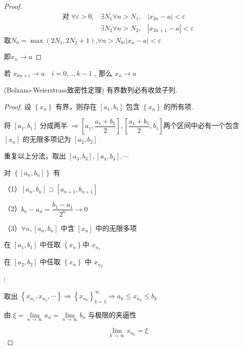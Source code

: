 \begin{proof}
	\begin{align*}
		\textbf{对 }\forall \varepsilon>0,&\exists N_1 \forall n>N_1, &\left|x_{2n}-a\right|<\varepsilon \\
		&\exists N_2 \forall n>N_2 ,&\left|x_{2 n+1}-a\right|<\varepsilon
	\end{align*}
	取$ N_0=\max(2 N_1,2 N_2+1)$,$\forall n>N_0$,$\left|x_n-a\right|<\varepsilon$
	
	即$  x_n \rightarrow a$
\end{proof}
\begin{corollary}
	若 $ x_{k n+i} \rightarrow a \quad i=0, . ., k-1$ , 那么  $ x_n \rightarrow a$
\end{corollary}
\begin{theorem}(Bolzano-Weierstrass致密性定理)
	有界数列必有收敛子列.
\end{theorem}
\begin{proof}
	设 $\left\{x_n\right\}$ 有界，则存在 $\left[a_1, b_1\right]$ 包含 $\left\{x_n\right\}$ 的所有项.
	
	将 $\left[a_1, b_1\right]$ 分成两半 $\Rightarrow\left[a_1, \dfrac{a_1+b_1}{2}\right],\left[\dfrac{a_1+b_1}{2}, b_1\right]$两个区间中必有一个包含 $\left[x_n\right]$ 的无限多项记为 $\left[a_2, b_2\right]$
	
	重复以上分法，取出 $\left[a_3, b_3\right],\left[a_4, b_4\right], \cdots$
	
	对 $\left\{\left[a_n,b_n\right]\right\}$ 有
	
	（1）$\left[a_n, b_n\right] \supset\left[a_{n+1}, b_{n+1}\right]$
	
	（2）$b_n-a_n=\dfrac{b_1-a_1}{2^n} \rightarrow 0$
	
	（3）$\forall n,\left[a_n, b_n\right]$ 中含 $\left[x_n\right]$ 中的无限多项
	
	在 $\left[a_1, b_1\right]$ 中任取 $\left\{x_n\right\}$中 $x_{n_1}$
	
	在 $\left[a_2, b_2\right]$ 中任取 $\left\{x_n\right\}$ 中 $x_{n_2}$
	
	$\vdots$
	
	取出 $\left\{x_{n_1}, x_{n_2}, \cdots\right\}$$ \Rightarrow\left\{x_{n_k}\right\}_{k=1}^{\infty} \Rightarrow a_k \leqslant x_{n_k} \leqslant b_k$
	
	由 $\xi=\lim\limits _{n \rightarrow \infty} a_n=\lim\limits _{n \rightarrow \infty}b_n$ 与极限的夹逼性
	
	$$
	\lim _{k \rightarrow \infty} x_{n_k}=\xi
	$$
\end{proof}

